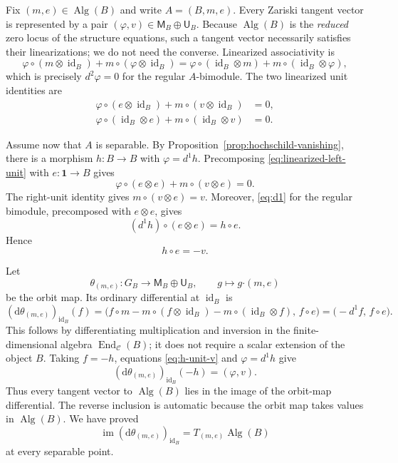 \documentclass[11pt]{amsart}
\theoremstyle{definition}
\theoremstyle{remark}
\newcommand{\C}{\mathcal C}
\newcommand{\one}{\mathbf 1}
\DeclareMathOperator{\End}{End}
\DeclareMathOperator{\Alg}{Alg}
\DeclareMathOperator{\id}{id}
\begin{document}
Fix $(m,e)\in\Alg(B)$ and write $A=(B,m,e)$.  Every Zariski tangent
vector is represented by a pair
$(\varphi,v)\in\mathsf M_B\oplus\mathsf U_B$.  Because $\Alg(B)$ is the
\emph{reduced} zero locus of the structure equations, such a tangent vector
necessarily satisfies their linearizations; we do not need the converse.
Linearized associativity is
\begin{equation}\label{eq:linearized-assoc}
  \varphi\circ(m\otimes\id_B)+m\circ(\varphi\otimes\id_B)
  =
  \varphi\circ(\id_B\otimes m)+m\circ(\id_B\otimes\varphi),
\end{equation}
which is precisely $d^2\varphi=0$ for the regular $A$-bimodule.  The two
linearized unit identities are
\begin{align}
  \varphi\circ(e\otimes\id_B)+m\circ(v\otimes\id_B)&=0,
  \label{eq:linearized-left-unit}\\
  \varphi\circ(\id_B\otimes e)+m\circ(\id_B\otimes v)&=0.
  \label{eq:linearized-right-unit}
\end{align}

Assume now that $A$ is separable.  By
Proposition~\ref{prop:hochschild-vanishing}, there is a morphism $h:B\to B$
with $\varphi=d^1h$.
Precomposing \eqref{eq:linearized-left-unit} with
$e:\one\to B$ gives
\begin{equation}\label{eq:h-on-unit}
  \varphi\circ(e\otimes e)+m\circ(v\otimes e)=0.
\end{equation}
The right-unit identity gives $m\circ(v\otimes e)=v$.  Moreover,
\eqref{eq:d1} for the regular bimodule, precomposed with
$e\otimes e$, gives
\[
  (d^1h)\circ(e\otimes e)=h\circ e.
\]
Hence
\begin{equation}\label{eq:h-unit-v}
  h\circ e=-v.
\end{equation}

Let
\[
  \theta_{(m,e)}:G_B\longrightarrow\mathsf M_B\oplus\mathsf U_B,
  \qquad
  g\longmapsto g\boldsymbol\cdot(m,e)
\]
be the orbit map.  Its ordinary differential at $\id_B$ is
\begin{equation}\label{eq:orbit-differential-alg}
  (\mathrm d\theta_{(m,e)})_{\id_B}(f)
  =\bigl(f\circ m-m\circ(f\otimes\id_B)-m\circ(\id_B\otimes f),\,
  f\circ e\bigr)
  =\bigl(-d^1f,\,f\circ e\bigr).
\end{equation}
This follows by differentiating multiplication and inversion in the
finite-dimensional algebra $\End_{\C}(B)$; it does not require a scalar
extension of the object $B$.  Taking $f=-h$, equations
\eqref{eq:h-unit-v} and $\varphi=d^1h$ give
\[
  (\mathrm d\theta_{(m,e)})_{\id_B}(-h)=(\varphi,v).
\]
Thus every tangent vector to $\Alg(B)$ lies in the image of the orbit-map
differential.  The reverse inclusion is automatic because the orbit map
takes values in $\Alg(B)$.  We have proved
\begin{equation}\label{eq:full-tangent-alg}
  \operatorname{im}(\mathrm d\theta_{(m,e)})_{\id_B}
  =T_{(m,e)}\Alg(B)
\end{equation}
at every separable point.
\end{document}
